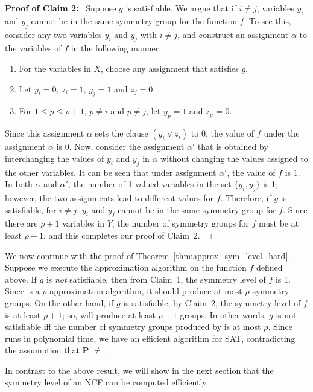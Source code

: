 \smallskip

\noindent
\textbf{Proof of Claim 2:}~ Suppose $g$ is satisfiable.
We argue that if $i \neq j$, variables $y_i$ and $y_j$
cannot be in the same symmetry group for the function $f$.
To see this, consider any two variables $y_i$ and $y_j$ with $i \neq j$,
and construct an assignment $\alpha$ to
the variables of $f$ in the following manner.
\begin{enumerate}
\item For the variables in $X$, choose any assignment that
satisfies $g$.
\item Let $y_i = 0$, $z_i = 1$, $y_j = 1$ and $z_j = 0$.
\item For $1 \leq p \leq \rho+1$, $p \neq i$ and $p \neq j$,
let $y_p = 1$ and $z_p$ = 0.
\end{enumerate}
Since this assignment $\alpha$ sets the clause $(y_i \vee \overline{z_i})$ to 0,
the value of $f$ under the assignment $\alpha$ is 0.
Now, consider the assignment $\alpha'$ that is obtained by interchanging
the values of $y_i$ and $y_j$ in $\alpha$ without changing the
values assigned to the other variables. 
It can be seen that under assignment $\alpha'$, the value of $f$ is 1.
In both $\alpha$ and $\alpha'$, the number of 1-valued variables in 
the set $\{y_i, y_j\}$ is 1; however, the two assignments lead to 
different values for $f$.
Therefore, if $g$ is satisfiable, for $i \neq j$, $y_i$ and $y_j$ cannot
be in the same symmetry group for $f$.
Since there are $\rho+1$ variables in $Y$, the number of symmetry groups 
for $f$ must be at least $\rho+1$, and this 
completes our proof of Claim~2. \hfill$\Box$

\medskip
 
We now continue with the proof of Theorem~\ref{thm:approx_sym_level_hard}.
Suppose we execute the approximation algorithm \cala{} 
on the function $f$ defined above.
If $g$ is \emph{not} satisfiable, then from Claim~1, 
the symmetry level of $f$ is 1. 
Since \cala{} is a $\rho$-approximation algorithm,
it should produce at most $\rho$ symmetry groups.
On the other hand, if $g$ is satisfiable, by Claim~2, the symmetry
level of $f$ is at least $\rho+1$; so, \cala{} will produce at least
$\rho+1$ groups.
In other words, $g$ is not satisfiable iff the number
of symmetry groups produced by \cala{} is at most $\rho$.
Since \cala{} runs in polynomial time, we have an efficient 
algorithm for SAT, contradicting the assumption that 
\textbf{P} $\neq$ \cnp.  \QED

\medskip

In contrast to the above result,
we will show in the next section that the symmetry level 
of an NCF can be computed efficiently.
